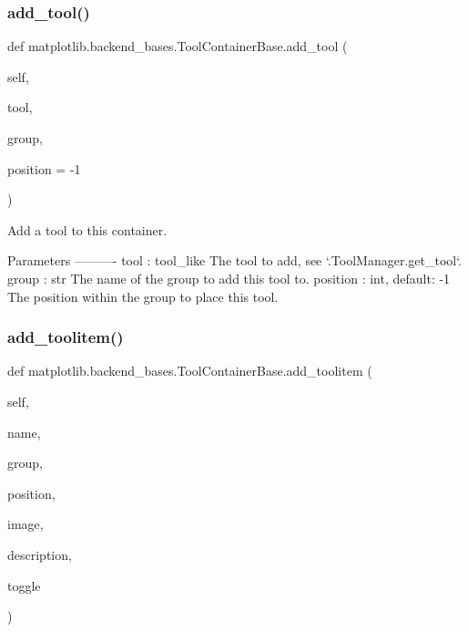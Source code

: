 \subsubsection{\texorpdfstring{add\+\_\+tool()}{add\_tool()}}
{\footnotesize\ttfamily def matplotlib.\+backend\+\_\+bases.\+Tool\+Container\+Base.\+add\+\_\+tool (\begin{DoxyParamCaption}\item[{}]{self,  }\item[{}]{tool,  }\item[{}]{group,  }\item[{}]{position = {\ttfamily -\/1} }\end{DoxyParamCaption})}

\begin{DoxyVerb}Add a tool to this container.

Parameters
----------
tool : tool_like
    The tool to add, see `.ToolManager.get_tool`.
group : str
    The name of the group to add this tool to.
position : int, default: -1
    The position within the group to place this tool.
\end{DoxyVerb}
 \mbox{\label{classmatplotlib_1_1backend__bases_1_1ToolContainerBase_abde6fc57ff2c485c2271ffda7524350a}} 
\subsubsection{\texorpdfstring{add\+\_\+toolitem()}{add\_toolitem()}}
{\footnotesize\ttfamily def matplotlib.\+backend\+\_\+bases.\+Tool\+Container\+Base.\+add\+\_\+toolitem (\begin{DoxyParamCaption}\item[{}]{self,  }\item[{}]{name,  }\item[{}]{group,  }\item[{}]{position,  }\item[{}]{image,  }\item[{}]{description,  }\item[{}]{toggle }\end{DoxyParamCaption})}

